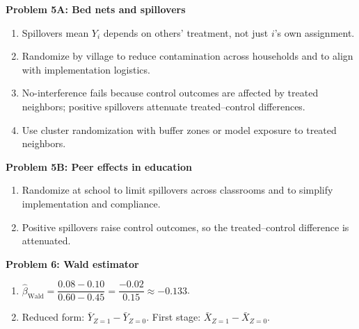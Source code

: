 \documentclass[12pt]{article}
\begin{document}
\vspace{0.5em}
\noindent\textbf{Problem 5A: Bed nets and spillovers}
\begin{enumerate}[label=\arabic*\alph*)]
  \item Spillovers mean $Y_i$ depends on others' treatment, not just $i$'s own assignment.
  \item Randomize by village to reduce contamination across households and to align with implementation logistics.
  \item No-interference fails because control outcomes are affected by treated neighbors; positive spillovers attenuate treated--control differences.
  \item Use cluster randomization with buffer zones or model exposure to treated neighbors.
\end{enumerate}

\vspace{0.5em}
\noindent\textbf{Problem 5B: Peer effects in education}
\begin{enumerate}[label=\arabic*\alph*)]
  \item Randomize at school to limit spillovers across classrooms and to simplify implementation and compliance.
  \item Positive spillovers raise control outcomes, so the treated--control difference is attenuated.
\end{enumerate}

\vspace{0.5em}
\noindent\textbf{Problem 6: Wald estimator}
\begin{enumerate}[label=\arabic*\alph*)]
  \item $\hat\beta_{\text{Wald}}=\dfrac{0.08-0.10}{0.60-0.45}=\dfrac{-0.02}{0.15}\approx-0.133$.
  \item Reduced form: $\bar Y_{Z=1}-\bar Y_{Z=0}$. First stage: $\bar X_{Z=1}-\bar X_{Z=0}$.
\end{enumerate}

\newpage

\nocite{butler2011politicians,angrist1991does,miguel2004worms,cardkrueger1994minimum}

\end{document}
